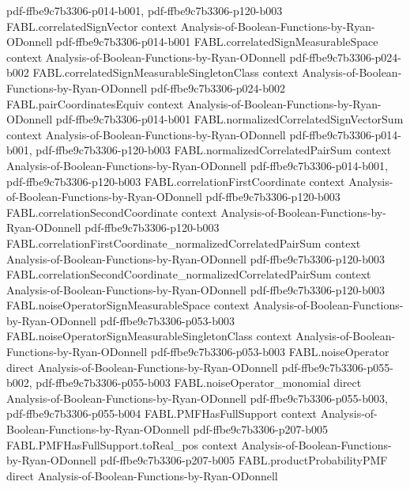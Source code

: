 \begin{theorem}
  {pdf-ffbe9c7b3306-p014-b001,
    pdf-ffbe9c7b3306-p120-b003}
\proofstep
  {FABL.correlatedSignVector}
  {context}
  {Analysis-of-Boolean-Functions-by-Ryan-ODonnell}
  {pdf-ffbe9c7b3306-p014-b001}
\proofstep
  {FABL.correlatedSignMeasurableSpace}
  {context}
  {Analysis-of-Boolean-Functions-by-Ryan-ODonnell}
  {pdf-ffbe9c7b3306-p024-b002}
\proofstep
  {FABL.correlatedSignMeasurableSingletonClass}
  {context}
  {Analysis-of-Boolean-Functions-by-Ryan-ODonnell}
  {pdf-ffbe9c7b3306-p024-b002}
\proofstep
  {FABL.pairCoordinatesEquiv}
  {context}
  {Analysis-of-Boolean-Functions-by-Ryan-ODonnell}
  {pdf-ffbe9c7b3306-p014-b001}
\proofstep
  {FABL.normalizedCorrelatedSignVectorSum}
  {context}
  {Analysis-of-Boolean-Functions-by-Ryan-ODonnell}
  {pdf-ffbe9c7b3306-p014-b001,
    pdf-ffbe9c7b3306-p120-b003}
\proofstep
  {FABL.normalizedCorrelatedPairSum}
  {context}
  {Analysis-of-Boolean-Functions-by-Ryan-ODonnell}
  {pdf-ffbe9c7b3306-p014-b001,
    pdf-ffbe9c7b3306-p120-b003}
\proofstep
  {FABL.correlationFirstCoordinate}
  {context}
  {Analysis-of-Boolean-Functions-by-Ryan-ODonnell}
  {pdf-ffbe9c7b3306-p120-b003}
\proofstep
  {FABL.correlationSecondCoordinate}
  {context}
  {Analysis-of-Boolean-Functions-by-Ryan-ODonnell}
  {pdf-ffbe9c7b3306-p120-b003}
\proofstep
  {FABL.correlationFirstCoordinate_normalizedCorrelatedPairSum}
  {context}
  {Analysis-of-Boolean-Functions-by-Ryan-ODonnell}
  {pdf-ffbe9c7b3306-p120-b003}
\proofstep
  {FABL.correlationSecondCoordinate_normalizedCorrelatedPairSum}
  {context}
  {Analysis-of-Boolean-Functions-by-Ryan-ODonnell}
  {pdf-ffbe9c7b3306-p120-b003}
\proofstep
  {FABL.noiseOperatorSignMeasurableSpace}
  {context}
  {Analysis-of-Boolean-Functions-by-Ryan-ODonnell}
  {pdf-ffbe9c7b3306-p053-b003}
\proofstep
  {FABL.noiseOperatorSignMeasurableSingletonClass}
  {context}
  {Analysis-of-Boolean-Functions-by-Ryan-ODonnell}
  {pdf-ffbe9c7b3306-p053-b003}
\proofstep
  {FABL.noiseOperator}
  {direct}
  {Analysis-of-Boolean-Functions-by-Ryan-ODonnell}
  {pdf-ffbe9c7b3306-p055-b002,
    pdf-ffbe9c7b3306-p055-b003}
\proofstep
  {FABL.noiseOperator_monomial}
  {direct}
  {Analysis-of-Boolean-Functions-by-Ryan-ODonnell}
  {pdf-ffbe9c7b3306-p055-b003,
    pdf-ffbe9c7b3306-p055-b004}
\proofstep
  {FABL.PMFHasFullSupport}
  {context}
  {Analysis-of-Boolean-Functions-by-Ryan-ODonnell}
  {pdf-ffbe9c7b3306-p207-b005}
\proofstep
  {FABL.PMFHasFullSupport.toReal_pos}
  {context}
  {Analysis-of-Boolean-Functions-by-Ryan-ODonnell}
  {pdf-ffbe9c7b3306-p207-b005}
\proofstep
  {FABL.productProbabilityPMF}
  {direct}
  {Analysis-of-Boolean-Functions-by-Ryan-ODonnell}

\end{theorem}
